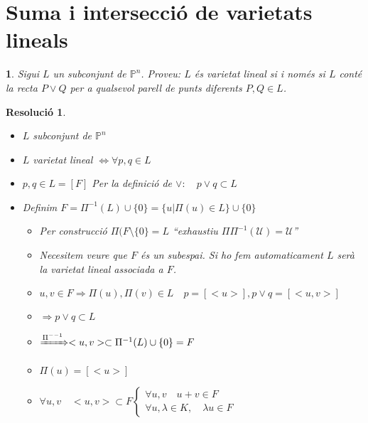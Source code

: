 \documentclass{article}
\newtheorem{resolucio}{Resolució}[section]
\newtheorem{N}{}[section]
\newcommand{\PP}{\mathbb{P}}
\newcommand{\U}{\mathcal{U}}
\begin{document}
\section{Suma i intersecció de varietats lineals}
\begin{N}
Sigui $L$ un subconjunt de $\PP^n$. Proveu: $L$ és varietat lineal si i només si $L$ conté la recta $P \vee Q$ per a qualsevol parell de punts diferents $P, Q \in L$.
\end{N}
\begin{resolucio}
\begin{itemize}
\item $L$ subconjunt de $\PP^n$
\item $L$ varietat lineal $\Leftrightarrow \forall p, q \in L$
\item[$\Rightarrow)$] $p, q \in L = [F]$
	\subitem Per la definició de $\vee: \quad p \vee q \subset L$
\item[$\Leftarrow)$] Definim $F = \Pi^{-1}(L) \cup \{0\} = \{u | \Pi(u) \in L\} \cup \{0\}$
	\begin{itemize}
	\item Per construcció $\Pi(F\setminus \{0\} = L$ ``exhaustiu $\Pi\Pi^{-1}(\U) = \U$''
	\item Necesitem veure que $F$ és un subespai. Si ho fem automaticament $L$ serà la varietat lineal associada a $F$.
	\item $u, v \in F \Rightarrow \Pi(u), \Pi(v) \in L \quad p = [<u>], p \vee q = [<u, v>]$
	\item $\Rightarrow p \vee q \subset L$
	\item $\xRightarrow{\Pi^{--1}} <u, v> \subset \Pi^{-1} (L) \cup \{0\} = F$ 
	\item $\Pi(u) = [<u>]$
	\item $\forall u, v \quad <u, v> \subset F \left\{\begin{array}{l}\forall u, v\quad u+v \in F\\\forall u, \lambda \in K,\quad \lambda u \in F\end{array}\right.$
	\end{itemize}
\end{itemize}
\end{resolucio}
\end{document}
